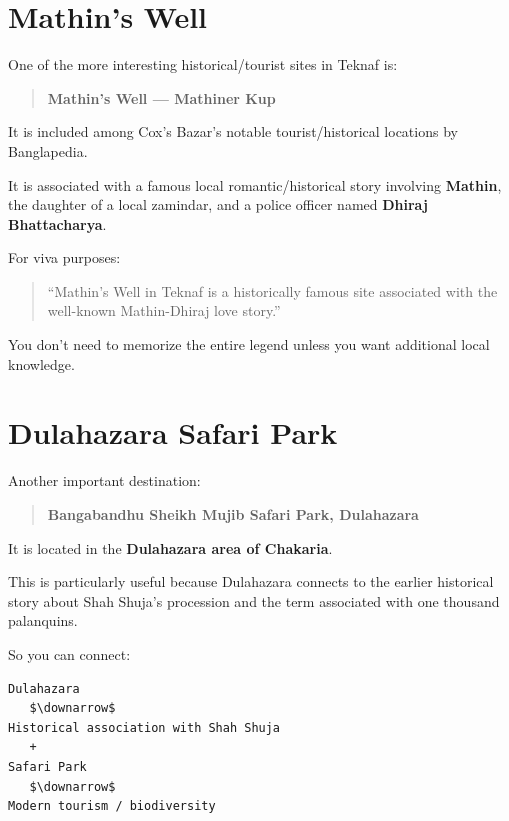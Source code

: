 \medskip

\section{Mathin's Well}

One of the more interesting historical/tourist sites in Teknaf is:

\begin{quote}
\textbf{Mathin's Well --- Mathiner Kup}\\
\end{quote}

It is included among Cox's Bazar's notable tourist/historical locations by Banglapedia.

It is associated with a famous local romantic/historical story involving \textbf{Mathin}, the daughter of a local zamindar, and a police officer named \textbf{Dhiraj Bhattacharya}.

For viva purposes:

\begin{quote}
``Mathin's Well in Teknaf is a historically famous site associated with the well-known Mathin-Dhiraj love story.''\\
\end{quote}

You don't need to memorize the entire legend unless you want additional local knowledge.

\medskip

\section{Dulahazara Safari Park}

Another important destination:

\begin{quote}
\textbf{Bangabandhu Sheikh Mujib Safari Park, Dulahazara}\\
\end{quote}

It is located in the \textbf{Dulahazara area of Chakaria}.

This is particularly useful because Dulahazara connects to the earlier historical story about Shah Shuja's procession and the term associated with one thousand palanquins.

So you can connect:

\begin{lstlisting}
Dulahazara
   $\downarrow$
Historical association with Shah Shuja
   +
Safari Park
   $\downarrow$
Modern tourism / biodiversity
\end{lstlisting}

